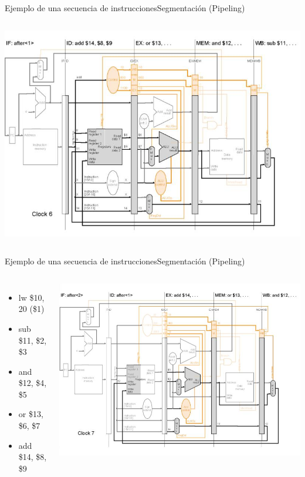 \documentclass[aspectratio=169,compress]{beamer}
\begin{document}
\begin{footnotesize}
\begin{frame}{Ejemplo de una secuencia de instrucciones}{Segmentación (Pipeling)}
\begin{columns}[onlytextwidth,T]
      \column{100mm}
\includegraphics[scale=0.35]{images/pipeling6.jpg} 
    \end{columns}

\end{frame}

\begin{frame}{Ejemplo de una secuencia de instrucciones}{Segmentación (Pipeling)}

 \begin{columns}[onlytextwidth,T]
      \column{\dimexpr\linewidth-110mm-5mm}

\bigskip
\begin{itemize}
\item lw \$10, 20 (\$1)
\item sub \$11, \$2, \$3
\item and \$12, \$4, \$5
\item or \$13, \$6, \$7
\item add \$14, \$8, \$9
\end{itemize}

      \column{100mm}
\includegraphics[scale=0.35]{images/pipeling7.jpg} 
    \end{columns}


\end{frame}
\end{footnotesize}
\end{document}
